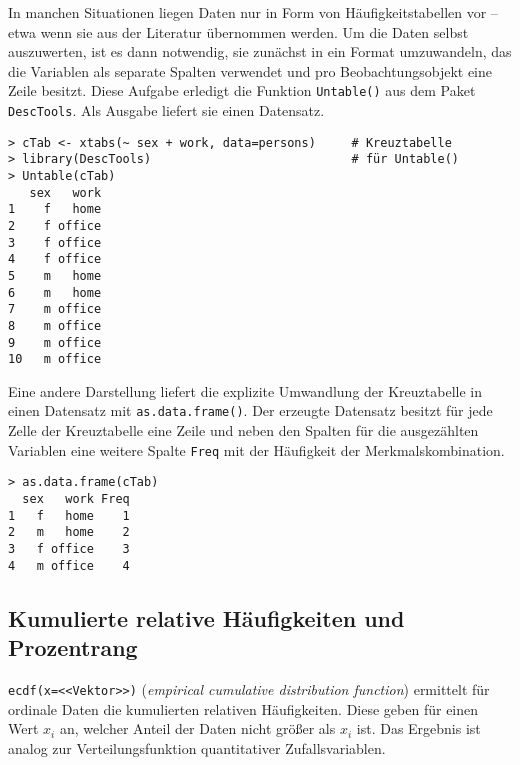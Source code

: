In manchen Situationen liegen Daten nur in Form von Häufigkeitstabellen vor -- etwa wenn sie aus der Literatur übernommen werden. Um die Daten selbst auszuwerten, ist es dann notwendig, sie zunächst in ein Format umzuwandeln, das die Variablen als separate Spalten verwendet und pro Beobachtungsobjekt eine Zeile besitzt. Diese Aufgabe erledigt die Funktion \lstinline!Untable()! aus dem Paket  \lstinline!DescTools!. Als Ausgabe liefert sie einen Datensatz.
\begin{lstlisting}
> cTab <- xtabs(~ sex + work, data=persons)     # Kreuztabelle
> library(DescTools)                            # für Untable()
> Untable(cTab)
   sex   work
1    f   home
2    f office
3    f office
4    f office
5    m   home
6    m   home
7    m office
8    m office
9    m office
10   m office
\end{lstlisting}

Eine andere Darstellung liefert die explizite Umwandlung der Kreuztabelle in einen Datensatz mit \lstinline!as.data.frame()!. Der erzeugte Datensatz besitzt für jede Zelle der Kreuztabelle eine Zeile und neben den Spalten für die ausgezählten Variablen eine weitere Spalte \lstinline!Freq! mit der Häufigkeit der Merkmalskombination.
\begin{lstlisting}
> as.data.frame(cTab)
  sex   work Freq
1   f   home    1
2   m   home    2
3   f office    3
4   m office    4
\end{lstlisting}

\subsection{Kumulierte relative Häufigkeiten und Prozentrang}
\label{sec:stepfun}

\lstinline!ecdf(x=<<Vektor>>)! (\emph{empirical cumulative distribution function}) ermittelt für ordinale Daten die kumulierten relativen Häufigkeiten. Diese geben für einen Wert $x_{i}$ an, welcher Anteil der Daten nicht größer als $x_{i}$ ist. Das Ergebnis ist analog zur Verteilungsfunktion quantitativer Zufallsvariablen.

